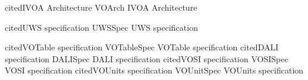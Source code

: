 %
%
%

\def\definestandard#1#2#3{%
  \expandafter\def\csname#1\endcsname{%
    \expandafter\ifx\csname#1cited\endcsname\relax #3 \citep{#2}%
    \expandafter\def\csname#1cited\endcsname{#1}%
      \else #3\fi}}

\definestandard{VOArch}       {2010ivoa.rept.1123A} {IVOA Architecture}

\definestandard{UWSSpec}      {2016ivoa.spec.1024H} {UWS specification}

\definestandard{VOTableSpec}  {2013ivoa.spec.0920O} {VOTable specification}
\definestandard{DALISpec}     {2017ivoa.spec.0517D} {DALI specification}
\definestandard{VOSISpec}     {2017ivoa.spec.0524G} {VOSI specification}
\definestandard{VOUnitSpec}   {2014ivoa.spec.0523D} {VOUnits specification}

%
\newcommand{\FigureRef}[1]{Figure \ref{#1}}
\newcommand{\SectionRef}[1]{Section \ref{#1}}
\newcommand{\SectionSee}[1]{(see Section \ref{#1})}
\newcommand{\AppendixRef}[1]{Appendix \ref{#1}}
